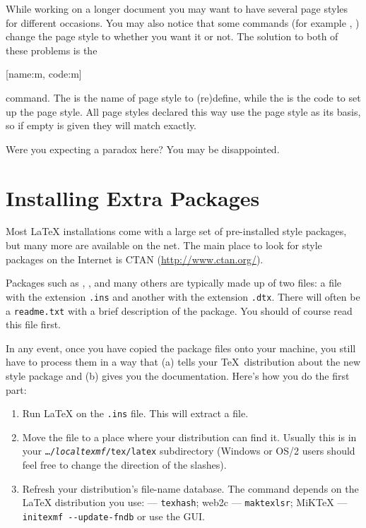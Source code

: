 While working on a longer document you may want to have several page styles for
different occasions. You may also notice that some commands (for example
, ) change the page style to  whether
you want it or not. The solution to both of these problems is the
\begin{lscommand}
  [name:m, code:m]
\end{lscommand}
command. The  is the name of page style to (re)define, while the %
 is the code to set up the page style. All page styles declared this
way use the  page style as its basis, so if empty  is
given they will match  exactly.
\begin{example}[standalone, paperheight=3cm]
\geometry{includehead, includefoot, headsep=.5em, footskip=1em} %
\sloppy %
\usepackage{fancyhdr}%
\usepackage{extramarks}%
\pagestyle{mine}

Were you expecting a paradox here?
\noindent
You may be disappointed.

\end{example}

\section{Installing Extra Packages}\label{sec:Packages}

Most \LaTeX{} installations come with a large set of pre-installed
style packages, but many more are available on the net. The main
place to look for style packages on the Internet is CTAN (\url{http://www.ctan.org/}).

Packages such as , , and many
others are typically made up of two files: a file with the extension
\texttt{.ins} and another with the extension \texttt{.dtx}. There
will often be a \texttt{readme.txt} with a brief description of the
package. You should of course read this file first.

In any event, once you have copied the package files onto your
machine, you still have to process them in a way that (a) tells your
\TeX\ distribution about the new style package and (b) gives you
the documentation.  Here's how you do the first part:

\begin{enumerate}
  \item Run \LaTeX{} on the \texttt{.ins} file. This will
        extract a  file.
  \item Move the  file to a place where your distribution
        can find it. Usually this is in your \texttt{\ldots/\emph{localtexmf}/tex/latex}
        subdirectory (Windows or OS/2 users should feel free to change the
        direction of the slashes).
  \item Refresh your distribution's file-name database. The command
        depends on the \LaTeX{} distribution you use:
        \TeXLive{} --- \texttt{texhash}; web2c --- \texttt{maktexlsr};
        MiK\TeX{} --- \texttt{initexmf -{}-update-fndb} or use the GUI\@.
\end{enumerate}


